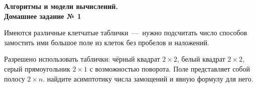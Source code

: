 \documentclass[a4paper,12pt]{article}
\begin{document}
	
	\thispagestyle{firstpage}
	
	\begin{center}
		\textbf{\Large{Алгоритмы и модели вычислений. \\ Домашнее задание № 1}}
	\end{center}


\begin{tasknum}{2}
	Имеются различные клетчатые таблички~---~нужно подсчитать число способов замостить ими большое поле из клеток без пробелов и наложений.
	
	Разрешено использовать таблички: чёрный квадрат $2\times 2$, белый квадрат $2\times 2$, серый прямоугольник $2\times 1$ с возможностью поворота. Поле представляет собой полосу $2\times n$. найдите асимптотику числа замощений и явную формулу для него.
\end{tasknum}
\end{document}
